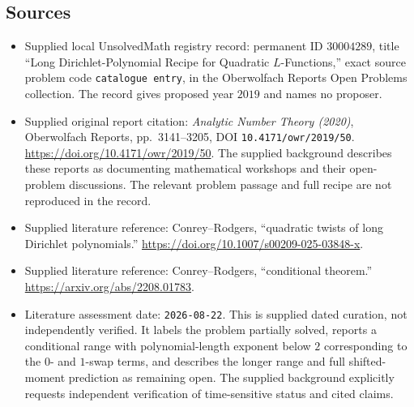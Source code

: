 \documentclass[11pt]{article}
\begin{document}
\subsection{Sources}
\begin{itemize}
\item Supplied local UnsolvedMath registry record: permanent ID \(30004289\), title ``Long Dirichlet-Polynomial Recipe for Quadratic \(L\)-Functions,'' exact source problem code \texttt{catalogue entry}, in the Oberwolfach Reports Open Problems collection. The record gives proposed year \(2019\) and names no proposer.
\item Supplied original report citation: \emph{Analytic Number Theory (2020)}, Oberwolfach Reports, pp.~3141--3205, DOI \texttt{10.4171/owr/2019/50}. \url{https://doi.org/10.4171/owr/2019/50}. The supplied background describes these reports as documenting mathematical workshops and their open-problem discussions. The relevant problem passage and full recipe are not reproduced in the record.
\item Supplied literature reference: Conrey--Rodgers, ``quadratic twists of long Dirichlet polynomials.'' \url{https://doi.org/10.1007/s00209-025-03848-x}.
\item Supplied literature reference: Conrey--Rodgers, ``conditional theorem.'' \url{https://arxiv.org/abs/2208.01783}.
\item Literature assessment date: \texttt{2026-08-22}. This is supplied dated curation, not independently verified. It labels the problem partially solved, reports a conditional range with polynomial-length exponent below \(2\) corresponding to the \(0\)- and \(1\)-swap terms, and describes the longer range and full shifted-moment prediction as remaining open. The supplied background explicitly requests independent verification of time-sensitive status and cited claims.
\end{itemize}
\end{document}
